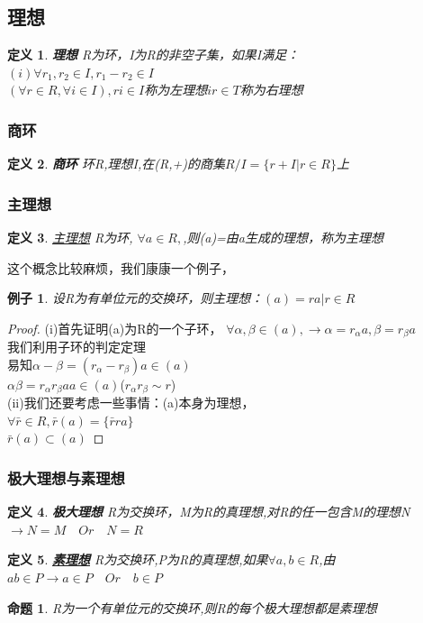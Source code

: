 \documentclass{report}
\newtheorem{proposition}[theorem]{命题}
\newtheorem{proof}{证明}[section]
\newtheorem{definition}{定义}
\newtheorem{example}{例子}[section]
\begin{document}
\subsection{理想}
\begin{definition}\textbf{理想}
\noindent R为环，I为R的非空子集，如果I满足：
\\$(i)\forall r_{1},r_{2}\in I,r_{1}-r_{2}\in I$\\
$(\forall r \in R,\forall i \in I),ri \in I$称为左理想$ir \in T$称为右理想
\end{definition}
\subsubsection{商环}
\begin{definition}\textbf{商环}
环R,理想I,在(R,+)的商集$R \bigg/ I = \{r+I|r \in R \}$上
\end{definition}
\subsubsection{主理想}
\begin{definition}
\href{https://ncatlab.org/nlab/show/ideal}{主理想}
R为环, $\forall a \in R,$,则(a)=由a生成的理想，称为主理想

\end{definition}
这个概念比较麻烦，我们康康一个例子，
\begin{example}
设R为有单位元的交换环，则主理想：$(a)={ra|r \in R}$
\end{example}
\begin{proof}
    (i)首先证明(a)为R的一个子环，
    $ \forall \alpha,\beta \in (a), \rightarrow \alpha =r_{\alpha}a,\beta= r_{\beta}a$
    \\我们利用子环的判定定理\\
    易知$\alpha - \beta =(r_{\alpha}-r_{\beta})a \in (a)$
    \\$\alpha \beta =r_{\alpha}r_{\beta}aa \in (a)$($r_{\alpha}r_{\beta} \sim r$)
    \\(ii)我们还要考虑一些事情：(a)本身为理想，
   \\  $\forall \bar{r} \in R, \bar{r}(a)= \lbrace \bar{r}ra \rbrace$
   \\ $\bar{r}(a) \subset (a) $
\end{proof}

\subsubsection{极大理想与素理想}
\begin{definition} \textbf{极大理想}
R为交换环，M为R的真理想,对R的任一包含M的理想N $\rightarrow N=M \quad Or \quad N=R$
\end{definition}
        \begin{definition}\href{https://ncatlab.org/nlab/show/prime%20ideal}{\textbf{素理想}}
\noindent R为交换环,P为R的真理想,如果$\forall a,b\in R$,由 $ab\in P \rightarrow a \in P \quad Or \quad b \in P$
\end{definition}
\begin{proposition}
R为一个有单位元的交换环,则R的每个极大理想都是素理想

\end{proposition}
\end{document}
